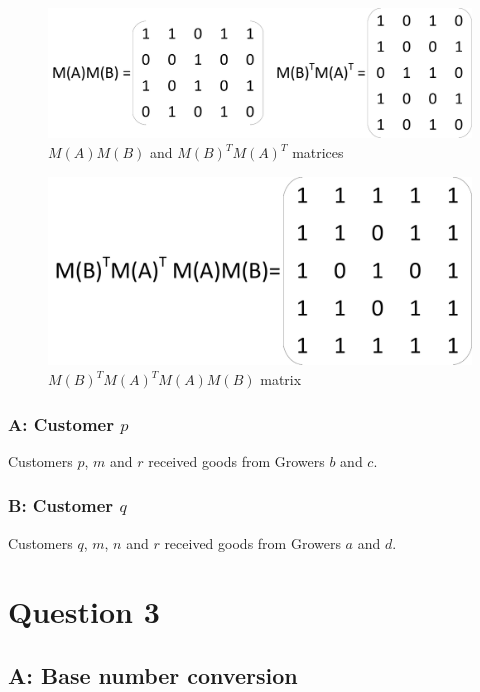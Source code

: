 \documentclass[12pt,a4paper]{article}
\begin{document}
\begin{figure}[h]
\centering
\caption{$M(A)M(B)$ and $M(B)^TM(A)^T$ matrices}
\includegraphics[scale=0.35]{./img/matrix_q2-3A.pdf}
\end{figure}

\begin{figure}[h]
\centering
\caption{$M(B)^TM(A)^TM(A)M(B)$ matrix}
\includegraphics[scale=0.35]{./img/matrix_q2-3B.pdf}
\end{figure}

\subsubsection{A: Customer $p$}

Customers $p$, $m$ and $r$ received goods from Growers $b$ and $c$.

\subsubsection{B: Customer $q$}

Customers $q$, $m$, $n$ and $r$ received goods from Growers $a$ and $d$.

\newpage
\section{Question 3}

\subsection{A: Base number conversion}
\end{document}
